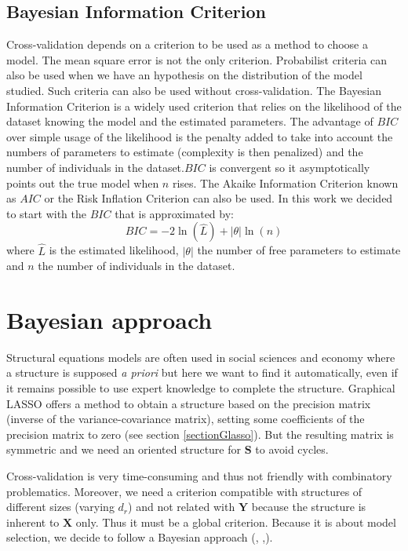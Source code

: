 \documentclass[12pt,a4paper]{report}
\begin{document}
			\subsection{ Bayesian Information Criterion}
			Cross-validation depends on a criterion to be used as a method to choose a model. The mean square error is not the only criterion. Probabilist criteria can also be used when we have an hypothesis on the distribution of the model studied. Such criteria can also be used without cross-validation.
			The Bayesian Information Criterion \cite{BIChuard,schwarz1978estimating} is a widely used criterion that relies on the likelihood of the dataset knowing the model and the estimated parameters. The advantage of $BIC$ over simple usage of the likelihood is the penalty added to take into account the numbers of parameters to estimate (complexity is then penalized) and the number of individuals in the dataset.$BIC$ is convergent so it asymptotically points out the true model when $n$ rises. The Akaike Information Criterion \cite{akaike1974new} known as $AIC$ or the Risk Inflation Criterion \cite{foster1994risk} can also be used.
			In this work we decided to start with the $BIC$ that is approximated by:
			\begin{equation}
				BIC=-2\ln(\hat{L})+|\theta|\ln(n)
			\end{equation}
			where $\hat{L}$ is the estimated likelihood, $|\theta|$ the number of free parameters to estimate and $n$ the number of individuals in the dataset.
			


\section{Bayesian approach}
Structural equations models are often used in social sciences and economy where a structure is supposed {\it a priori} but here we want to find it automatically, even if it remains possible to use expert knowledge to complete the structure. Graphical LASSO \cite{friedman2008sparse} offers a method to obtain a structure based on the precision matrix (inverse of the variance-covariance matrix), setting some coefficients of the precision matrix to zero (see section \ref{sectionGlasso}). But the resulting matrix is symmetric and we need an oriented structure for $\boldsymbol{S}$ to avoid cycles.

Cross-validation is very time-consuming and thus not friendly with combinatory problematics. Moreover, we need a criterion compatible with structures of different sizes (varying $d_r$) and not related with $\boldsymbol{Y}$ because the structure is inherent to $\boldsymbol{X}$ only. Thus it must be a global criterion. 	
Because it is about model selection, we decide to follow a Bayesian approach (\cite{raftery1995bayesian}, \cite{andrieu1999joint},\cite{chipman2001practical}).  
	
\end{document}
